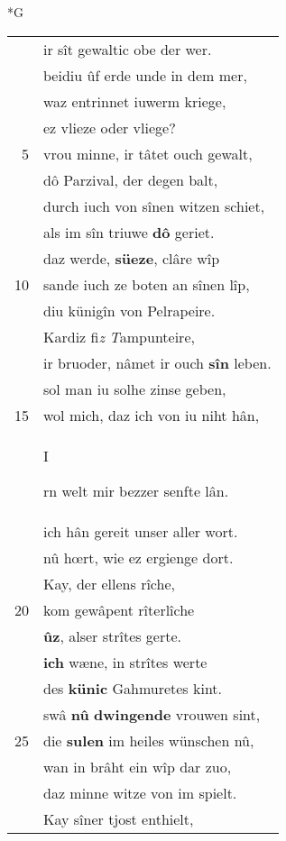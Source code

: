 \documentclass[8pt,a4paper,notitlepage]{article}
\begin{document}
\newpage
\begin{table}[ht]
\begin{minipage}[t]{0.5\linewidth}
\small
\begin{center}*G
\end{center}
\begin{tabular}{rl}
 & ir sît gewaltic obe der wer.\\ 
 & beidiu ûf erde unde in dem mer,\\ 
 & waz entrinnet iuwerm kriege,\\ 
 & ez vlieze oder vliege?\\ 
5 & vrou minne, ir tâtet ouch gewalt,\\ 
 & dô Parzival, der degen balt,\\ 
 & durch iuch von sînen witzen schiet,\\ 
 & als im sîn triuwe \textbf{dô} geriet.\\ 
 & daz werde, \textbf{süeze}, clâre wîp\\ 
10 & sande iuch ze boten an sînen lîp,\\ 
 & diu künigîn von Pelrapeire.\\ 
 & Kardiz fi\textit{z} \textit{T}ampunteire,\\ 
 & ir bruoder, nâmet ir ouch \textbf{sîn} leben.\\ 
 & sol man iu solhe zinse geben,\\ 
15 & wol mich, daz ich von iu niht hân,\\ 
 & \begin{large}I\end{large}rn welt mir bezzer senfte lân.\\ 
 & ich hân gereit unser aller wort.\\ 
 & nû hœrt, wie ez ergienge dort.\\ 
 & Kay, der ellens rîche,\\ 
20 & kom gewâpent rîterlîche\\ 
 & \textbf{ûz}, alser strîtes gerte.\\ 
 & \textbf{ich} wæne, in strîtes werte\\ 
 & des \textbf{künic} Gahmuretes kint.\\ 
 & swâ \textbf{nû} \textbf{dwingende} vrouwen sint,\\ 
25 & die \textbf{sulen} im heiles wünschen nû,\\ 
 & wan in brâht ein wîp dar zuo,\\ 
 & daz minne witze von im spielt.\\ 
 & Kay sîner tjost enthielt,\\ 

\end{tabular}
\end{minipage}
\end{table}
\end{document}

